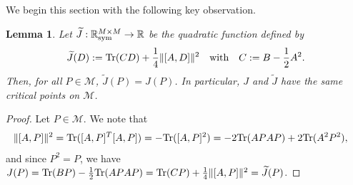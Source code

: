 \documentclass{article}
\def\R{\mathbb R}
\newtheorem{lemma}[theorem]{Lemma}
\newcommand{\tr}{{\rm Tr}}
\newcommand{\1}{{\mathds 1}}
\begin{document}
We begin this section with the following key observation.

\begin{lemma} \label{lem:convexification}
    Let $\widetilde J:\R^{M \times M}_{\rm sym} \to \R$ be the quadratic function defined by
\begin{equation}\label{eq:def_tildeJ}
\widetilde J(D) := \tr(CD) + \frac 14 \| [A,D] \|^2  \quad \mbox{with} \quad C := B- \frac 12 A^2.
\end{equation}
Then, for all $P \in \mathcal M$, $\widetilde J(P)=J(P)$. In particular, $J$ and $\widetilde J$ have the same critical points on $\mathcal M$.
\end{lemma}

\begin{proof} Let $P \in \mathcal M$. We note that
    \begin{align*}
    \| [A,P] \|^2 &= \tr([A,P]^T [A,P])
    = -\tr([A,P]^2) = - 2 \tr(APAP) + 2\tr( A^2P^2),
\end{align*}
and since $P^2=P$, we have
$
{J(P) = \tr(BP) - \frac 12 \tr(APAP) = \tr(CP) + \frac 14 \| [A,P] \|^2 = \widetilde J(P)}
$.
\end{proof}
\end{document}
